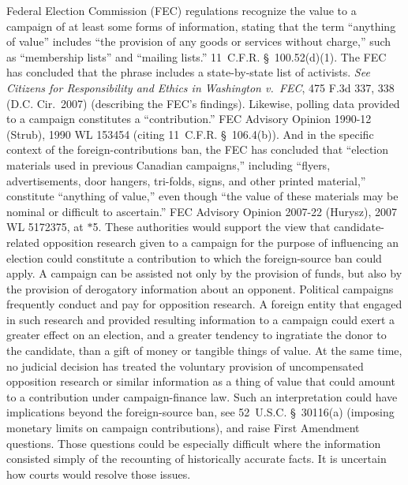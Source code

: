 Federal Election Commission (FEC) regulations recognize the value to a campaign of at least some forms of information, stating that the term ``anything of value'' includes ``the provision of any goods or services without charge,'' such as ``membership lists'' and ``mailing lists.''
11~C.F.R. \S~100.52(d)(1).
The FEC has concluded that the phrase includes a state-by-state list of activists.
\textit{See Citizens for Responsibility and Ethics in Washington v.\ FEC}, 475 F.3d 337, 338 (D.C. Cir.~2007) (describing the FEC's findings).
Likewise, polling data provided to a campaign constitutes a ``contribution.''
FEC Advisory Opinion 1990-12 (Strub), 1990 WL 153454 (citing 11~C.F.R. \S~106.4(b)).
And in the specific context of the foreign-contributions ban, the FEC has concluded that ``election materials used in previous Canadian campaigns,'' including ``flyers, advertisements, door hangers, tri-folds, signs, and other printed material,'' constitute ``anything of value,'' even though ``the value of these materials may be nominal or difficult to ascertain.''
FEC Advisory Opinion 2007-22 (Hurysz), 2007 WL 5172375, at $\ast$5.
These authorities would support the view that candidate-related opposition research given to a campaign for the purpose of influencing an election could constitute a contribution to which the foreign-source ban could apply.
A campaign can be assisted not only by the provision of funds, but also by the provision of derogatory information about an opponent.
Political campaigns frequently conduct and pay for opposition research.
A foreign entity that engaged in such research and provided resulting information to a campaign could exert a greater effect on an election, and a greater tendency to ingratiate the donor to the candidate, than a gift of money or tangible things of value.
At the same time, no judicial decision has treated the voluntary provision of uncompensated opposition research or similar information as a thing of value that could amount to a contribution under campaign-finance law.
Such an interpretation could have implications beyond the foreign-source ban, see 52~U.S.C. \S~30116(a) (imposing monetary limits on campaign contributions), and raise First Amendment questions.
Those questions could be especially difficult where the information consisted simply of the recounting of historically accurate facts.
It is uncertain how courts would resolve those issues.

